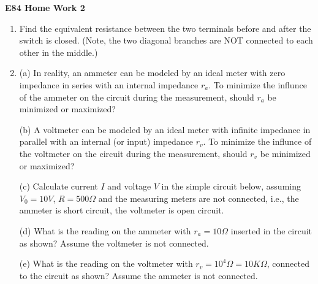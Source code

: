 \usepackage{html}

\begin{center}
{\Large \bf E84 Home Work 2}
\end{center}
\begin{enumerate}

The calculations of all problems in this problem set are straight forward.
However, the concepts involving source, load, internal (output) impedance
of the source and the input impedance of the load are very important. After
finding the numerical solutions of the problem, pause and reflect what they
mean. 

\item Find the equivalent resistance between the two terminals before and
after the switch is closed. (Note, the two diagonal branches are NOT
connected to each other in the middle.)



\item (a) In reality, an ammeter can be modeled by an ideal meter with zero impedance 
  in series with an internal impedance $r_a$. To minimize the influnce of the ammeter
  on the circuit during the measurement, should $r_a$ be minimized or maximized?

  (b) A voltmeter can be modeled by an ideal meter with infinite impedance in parallel
  with an internal (or input) impedance $r_v$. To minimize the influnce of the voltmeter 
  on the circuit during the measurement, should $r_v$ be minimized or maximized?

  (c) Calculate current $I$ and voltage $V$ in the simple circuit below, assuming 
  $V_0=10V$, $R=500\Omega$ and the measuring meters are not connected, i.e., the ammeter
  is short circuit, the voltmeter is open circuit.

  (d) What is the reading on the ammeter with $r_a=10\Omega$ inserted in the circuit 
  as shown? Assume the voltmeter is not connected.

  (e) What is the reading on the voltmeter with $r_v=10^4 \Omega = 10 K\Omega$, connected
  to the circuit as shown? Assume the ammeter is not connected.





\end{enumerate}
